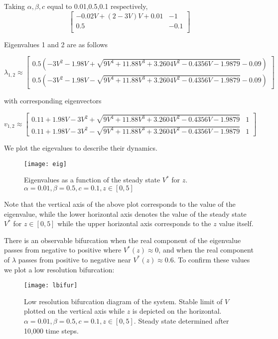 \documentclass[11pt]{report}
\begin{document}
Taking $\alpha,\beta,c$ equal to 0.01,0.5,0.1 respectively,
$$
\begin{bmatrix}
    −0.02V + (2 - 3V)V+0.01 & -1 \\
    0.5 & -0.1 \\    
\end{bmatrix}
$$

Eigenvalues 1 and 2 are as follows

$$ \lambda_{1,2} \approx \begin{bmatrix} 0.5(-3V^2 - 1.98V + \sqrt{ 9V^4 + 11.88 V^3 + 3.2604 V^2 - 0.4356 V - 1.9879 } - 0.09) \\ 0.5(-3V^2 - 1.98V - \sqrt{ 9V^4 + 11.88 V^3 + 3.2604 V^2 - 0.4356 V - 1.9879 } - 0.09) \end{bmatrix} $$

with corresponding eigenvectors

$$ v_{1,2} \approx \begin{bmatrix} 0.11 + 1.98V - 3V^2 + \sqrt{ 9V^4 + 11.88 V^3 + 3.2604 V^2 - 0.4356 V - 1.9879} & 1 \\ 0.11 + 1.98V - 3V^2 - \sqrt{ 9V^4 + 11.88 V^3 + 3.2604 V^2 - 0.4356 V - 1.9879} & 1 \end{bmatrix} $$

We plot the eigevalues to describe their dynamics. 

\begin{figure}[!ht]
  \caption{Eigenvalues as a function of the steady state $V^*$ for $z$.  $\alpha = 0.01, \beta = 0.5,c = 0.1,z \in [0,5]$ }
  \centering
    \texttt{[image: eig]}
\end{figure}

Note that the vertical axis of the above plot corresponds to the value of the eigenvalue, while the lower horizontal axis denotes the value of the steady state $V^*$ for $z \in [0,5]$ while the upper horizontal axis corresponds to the $z$ value itself.

There is an observable bifurcation when the real component of the eigenvalue passes from negative to positive where $V^*(z) \approx 0$, and when the real component of $\lambda$ passes from positive to negative near $V^*(z) \approx 0.6$. To confirm these values we plot a low resolution bifurcation:


\begin{figure}[!ht]
  \caption{Low resolution bifurcation diagram of the system. Stable limit of $V$ plotted on the vertical axis while $z$ is depicted on the horizontal. $\alpha = 0.01, \beta = 0.5,c = 0.1,z \in [0,5]$. Steady state determined after 10,000 time steps. }
  \centering
    \texttt{[image: lbifur]}
\end{figure}
\end{document}
